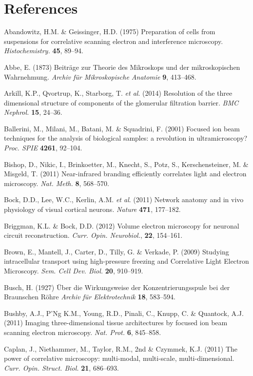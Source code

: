 \documentclass{article}
\begin{document}
\section*{References}
\begin{hangpars}
Abandowitz, H.M. \& Geissinger, H.D. (1975) Preparation of cells from suspensions for correlative scanning electron and interference microscopy. \textit{Histochemistry.} \textbf{45}, 89–94.

Abbe, E. (1873) Beiträge zur Theorie des Mikroskops und der mikroskopischen Wahrnehmung. \textit{Archiv für Mikroskopische Anatomie} \textbf{9}, 413–468.

Arkill, K.P., Qvortrup, K., Starborg, T. \textit{et al}. (2014) Resolution of the three dimensional structure of components of the glomerular filtration barrier. \textit{BMC Nephrol.} \textbf{15}, 24–36.

Ballerini, M., Milani, M., Batani, M. \& Squadrini, F. (2001) Focused ion beam techniques for the analysis of biological samples: a revolution in ultramicroscopy? \textit{Proc. SPIE} \textbf{4261}, 92–104.

Bishop, D., Nikic, I., Brinkoetter, M., Knecht, S., Potz, S., Kerschensteiner, M. \& Misgeld, T. (2011) Near-infrared branding efficiently correlates light and electron microscopy. \textit{Nat. Meth.} \textbf{8}, 568–570.

Bock, D.D., Lee, W.C., Kerlin, A.M. \textit{et al}. (2011) Network anatomy and in vivo physiology of visual cortical neurons. \textit{Nature} \textbf{471}, 177–182.

Briggman, K.L. \& Bock, D.D. (2012) Volume electron microscopy for neuronal circuit reconstruction. \textit{Curr. Opin. Neurobiol.}, \textbf{22}, 154–161.

Brown, E., Mantell, J., Carter, D., Tilly, G. \& Verkade, P. (2009) Studying intracellular transport using high-pressure freezing and Correlative Light Electron Microscopy. \textit{Sem. Cell Dev. Biol.} \textbf{20}, 910–919.

Busch, H. (1927) Über die Wirkungsweise der Konzentrierungsspule bei der Braunschen Röhre \textit{Archiv für Elektrotechnik} \textbf{18}, 583–594.

Bushby, A.J., P’Ng K.M., Young, R.D., Pinali, C., Knupp, C. \& Quantock, A.J. (2011) Imaging three-dimensional tissue architectures by focused ion beam scanning electron microscopy. \textit{Nat. Prot.} \textbf{6}, 845–858.

Caplan, J., Niethammer, M., Taylor, R.M., 2nd \& Czymmek, K.J. (2011) The power of correlative microscopy: multi-modal, multi-scale, multi-dimensional. \textit{Curr. Opin. Struct. Biol.} \textbf{21}, 686–693.


\end{hangpars}
\end{document}
